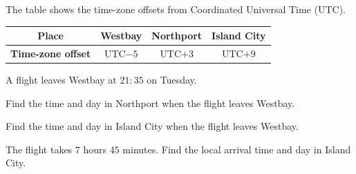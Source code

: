  The table shows the time-zone offsets from Coordinated Universal Time (UTC).

\begin{center}
\begin{tabular}{|c|c|c|c|}
\hline
\textbf{Place} & Westbay & Northport & Island City \\
\hline
\textbf{Time-zone offset} & UTC$-5$ & UTC$+3$ & UTC$+9$ \\
\hline
\end{tabular}
\end{center}

A flight leaves Westbay at $21{:}35$ on Tuesday.
\begin{subparts}
  \item Find the time and day in Northport when the flight leaves Westbay.
  \item Find the time and day in Island City when the flight leaves Westbay.
  \item The flight takes $7$ hours $45$ minutes. Find the local arrival time and day in Island City.
\end{subparts}

